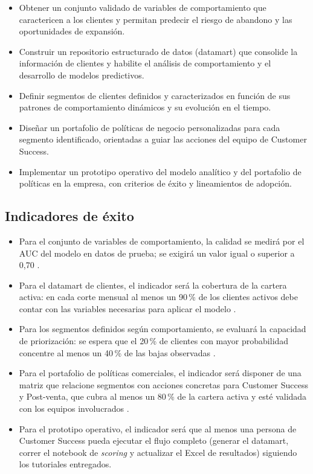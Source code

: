 \begin{itemize}
    \item Obtener un conjunto validado de variables de comportamiento que caractericen a los clientes y permitan predecir el riesgo de abandono y las oportunidades de expansión.
    
    \item Construir un repositorio estructurado de datos (datamart) que consolide la información de clientes y habilite el análisis de comportamiento y el desarrollo de modelos predictivos.
    
    \item Definir segmentos de clientes definidos y caracterizados en función de sus patrones de comportamiento dinámicos y su evolución en el tiempo.
    
    \item Diseñar un portafolio de políticas de negocio personalizadas para cada segmento identificado, orientadas a guiar las acciones del equipo de Customer Success.

    \item Implementar un prototipo operativo del modelo analítico y del portafolio de políticas en la empresa, con criterios de éxito y lineamientos de adopción.

\end{itemize}

\subsection{Indicadores de éxito}

\begin{itemize}
    \item Para el conjunto de variables de comportamiento, la calidad se medirá por el AUC del modelo en datos de prueba; se exigirá un valor igual o superior a 0{,}70 \citep{Hosmer2013}.

    \item Para el datamart de clientes, el indicador será la cobertura de la cartera activa: en cada corte mensual al menos un 90\,\% de los clientes activos debe contar con las variables necesarias para aplicar el modelo \citep{Kumar2010}.

    \item Para los segmentos definidos según comportamiento, se evaluará la capacidad de priorización: se espera que el 20\,\% de clientes con mayor probabilidad concentre al menos un 40\,\% de las bajas observadas \citep{SAS41683}.

    \item Para el portafolio de políticas comerciales, el indicador será disponer de una matriz que relacione segmentos con acciones concretas para Customer Success y Post-venta, que cubra al menos un 80\,\% de la cartera activa y esté validada con los equipos involucrados \citep{Kumar2010}.

    \item Para el prototipo operativo, el indicador será que al menos una persona de Customer Success pueda ejecutar el flujo completo (generar el datamart, correr el notebook de \emph{scoring} y actualizar el Excel de resultados) siguiendo los tutoriales entregados.
\end{itemize}

